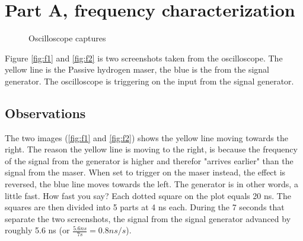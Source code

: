 \documentclass[11pt,english,a4paper]{article}
\begin{document}
\section{Part A, frequency characterization}
\begin{figure}[!htb]
  \centering
  \hfill
  \caption{Oscilloscope captures}
\end{figure}
Figure \ref{fig:f1} and \ref{fig:f2} is two screenshots taken from the oscilloscope. The yellow line is the Passive hydrogen maser, the blue is the from the signal generator. The oscilloscope is triggering on the input from the signal generator. 

\subsection{Observations}
The two images (\ref{fig:f1} and \ref{fig:f2}) shows the yellow line moving towards the right. The reason the yellow line is moving to the right, is because the frequency of the signal from the generator is higher and therefor "arrives earlier" than the signal from the maser. When set to trigger on the maser instead, the effect is reversed, the blue line moves towards the left. The generator is in other words, a little fast. How fast you say? Each dotted square on the plot equals 20 ns. The squares are then divided into 5 parts at 4 ns each. During the 7 seconds that separate the two screenshots, the signal from the signal generator advanced by roughly 5.6 ns (or $\frac{5.6ns}{7s}=0.8ns/s$).
\end{document}
